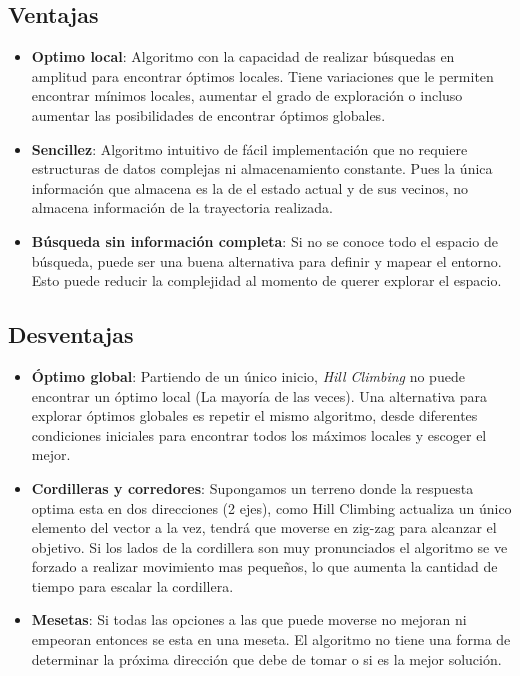 \documentclass[12pt,twoside]{article}
\begin{document}
	
	\subsection{Ventajas}
	
	\begin{itemize}
		\item \textbf{Optimo local}: Algoritmo con la capacidad de realizar búsquedas en amplitud para encontrar óptimos locales. Tiene variaciones que le permiten encontrar mínimos locales, aumentar el grado de exploración o incluso aumentar las posibilidades de encontrar óptimos globales.
		
		\item \textbf{Sencillez}: Algoritmo intuitivo de fácil implementación que no requiere estructuras de datos complejas ni almacenamiento constante. Pues la única información que almacena es la de el estado actual y de sus vecinos, no almacena información de la trayectoria realizada.
		
		\item \textbf{Búsqueda sin información completa}: Si no se conoce todo el espacio de búsqueda, puede ser una buena alternativa para definir y mapear el entorno. Esto puede reducir la complejidad al momento de querer explorar el espacio.
		
	\end{itemize}
	
	
	\subsection{Desventajas}
	
	\begin{itemize}
		\item \textbf{Óptimo global}: Partiendo de un único inicio, \textit{Hill Climbing} no puede encontrar un óptimo local (La mayoría de las veces). Una alternativa para explorar óptimos globales es repetir el mismo algoritmo, desde diferentes condiciones iniciales para encontrar todos los máximos locales y escoger el mejor. 
		
		\item \textbf{Cordilleras y corredores}: Supongamos un terreno donde la respuesta optima esta en dos direcciones (2 ejes), como Hill Climbing actualiza un único elemento del vector a la vez, tendrá que moverse en zig-zag para alcanzar el objetivo.  Si los lados de la cordillera son muy pronunciados el algoritmo se ve forzado a realizar movimiento mas pequeños, lo que aumenta la cantidad de tiempo para escalar la cordillera.
		
		\item \textbf{Mesetas}: Si todas las opciones a las que puede moverse no mejoran ni empeoran entonces se esta en una meseta. El algoritmo no tiene una forma de determinar la próxima dirección que debe de tomar o si es la mejor solución. 
	\end{itemize}
\end{document}
